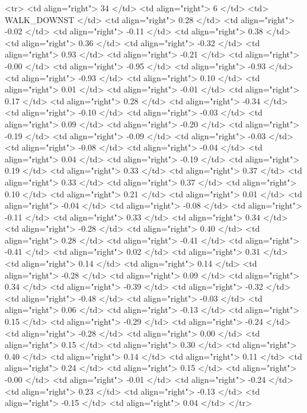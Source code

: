   <tr> <td align="right"> 34 </td> <td align="right">   6 </td> <td> WALK_DOWNST </td> <td align="right"> 0.28 </td> <td align="right"> -0.02 </td> <td align="right"> -0.11 </td> <td align="right"> 0.38 </td> <td align="right"> 0.36 </td> <td align="right"> -0.32 </td> <td align="right"> 0.93 </td> <td align="right"> -0.21 </td> <td align="right"> -0.00 </td> <td align="right"> -0.95 </td> <td align="right"> -0.93 </td> <td align="right"> -0.93 </td> <td align="right"> 0.10 </td> <td align="right"> 0.01 </td> <td align="right"> -0.01 </td> <td align="right"> 0.17 </td> <td align="right"> 0.28 </td> <td align="right"> -0.34 </td> <td align="right"> -0.10 </td> <td align="right"> -0.03 </td> <td align="right"> 0.09 </td> <td align="right"> -0.20 </td> <td align="right"> -0.19 </td> <td align="right"> -0.09 </td> <td align="right"> -0.03 </td> <td align="right"> -0.08 </td> <td align="right"> -0.04 </td> <td align="right"> 0.04 </td> <td align="right"> -0.19 </td> <td align="right"> 0.19 </td> <td align="right"> 0.33 </td> <td align="right"> 0.37 </td> <td align="right"> 0.33 </td> <td align="right"> 0.37 </td> <td align="right"> 0.10 </td> <td align="right"> 0.21 </td> <td align="right"> 0.01 </td> <td align="right"> -0.04 </td> <td align="right"> -0.08 </td> <td align="right"> -0.11 </td> <td align="right"> 0.33 </td> <td align="right"> 0.34 </td> <td align="right"> -0.28 </td> <td align="right"> 0.40 </td> <td align="right"> 0.28 </td> <td align="right"> -0.41 </td> <td align="right"> -0.41 </td> <td align="right"> 0.02 </td> <td align="right"> 0.31 </td> <td align="right"> 0.14 </td> <td align="right"> 0.14 </td> <td align="right"> -0.28 </td> <td align="right"> 0.09 </td> <td align="right"> 0.34 </td> <td align="right"> -0.39 </td> <td align="right"> -0.32 </td> <td align="right"> -0.48 </td> <td align="right"> -0.03 </td> <td align="right"> 0.06 </td> <td align="right"> -0.13 </td> <td align="right"> 0.15 </td> <td align="right"> -0.29 </td> <td align="right"> -0.24 </td> <td align="right"> -0.28 </td> <td align="right"> 0.00 </td> <td align="right"> 0.15 </td> <td align="right"> 0.30 </td> <td align="right"> 0.40 </td> <td align="right"> 0.14 </td> <td align="right"> 0.11 </td> <td align="right"> 0.24 </td> <td align="right"> 0.15 </td> <td align="right"> -0.00 </td> <td align="right"> -0.01 </td> <td align="right"> -0.24 </td> <td align="right"> 0.23 </td> <td align="right"> -0.13 </td> <td align="right"> -0.15 </td> <td align="right"> 0.04 </td> </tr>
